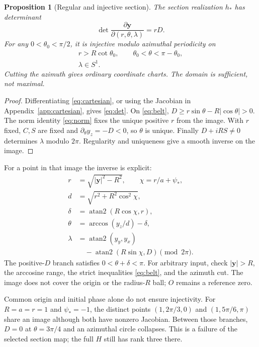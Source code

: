 \documentclass[11pt]{article}
\newtheorem{proposition}{Proposition}
\begin{document}
\begin{proposition}[Regular and injective section]
The section realization $h_*$ has determinant
\begin{equation}
 \det\frac{\partial\bm y}{\partial(r,\theta,\lambda)}=rD.
 \label{eq:det}
\end{equation}
For any $0<\theta_0<\pi/2$, it is injective modulo azimuthal periodicity on
\begin{equation}
 \begin{gathered}
 r>R\cot\theta_0,\qquad
 \theta_0<\theta<\pi-\theta_0,\\
 \lambda\in S^1.
 \end{gathered}
 \label{eq:belt}
\end{equation}
Cutting the azimuth gives ordinary coordinate charts. The domain is sufficient, not maximal.
\end{proposition}
\begin{proof}
Differentiating \eqref{eq:cartesian}, or using the Jacobian in Appendix~\ref{app:cartesian}, gives \eqref{eq:det}. On \eqref{eq:belt}, $D\ge r\sin\theta-R|\cos\theta|>0$. The norm identity \eqref{eq:norm} fixes the unique positive $r$ from the image. With $r$ fixed, $C,S$ are fixed and $\partial_\theta y_z=-D<0$, so $\theta$ is unique. Finally $D+iRS\ne0$ determines $\lambda$ modulo $2\pi$. Regularity and uniqueness give a smooth inverse on the image.
\end{proof}

For a point in that image the inverse is explicit:
\begin{equation}
 \begin{aligned}
 r&=\sqrt{|\bm y|^2-R^2},\qquad\chi=r/a+\psi_*,\\
 d&=\sqrt{r^2+R^2\cos^2\chi},\\
 \delta&=\operatorname{atan2}(R\cos\chi,r),\\
 \theta&=\arccos(y_z/d)-\delta,\\
 \lambda&=\operatorname{atan2}(y_y,y_x)\\
 &\quad-\operatorname{atan2}(R\sin\chi,D)\pmod{2\pi}.
 \end{aligned}
 \label{eq:inverse}
\end{equation}
The positive-$D$ branch satisfies $0<\theta+\delta<\pi$. For arbitrary input, check $|\bm y|>R$, the arccosine range, the strict inequalities \eqref{eq:belt}, and the azimuth cut. The image does not cover the origin or the radius-$R$ ball; $O$ remains a reference zero.

Common origin and initial phase alone do not ensure injectivity. For $R=a=r=1$ and $\psi_*=-1$, the distinct points $(1,2\pi/3,0)$ and $(1,5\pi/6,\pi)$ share an image although both have nonzero Jacobian. Between those branches, $D=0$ at $\theta=3\pi/4$ and an azimuthal circle collapses. This is a failure of the selected section map; the full $H$ still has rank three there.
\end{document}
